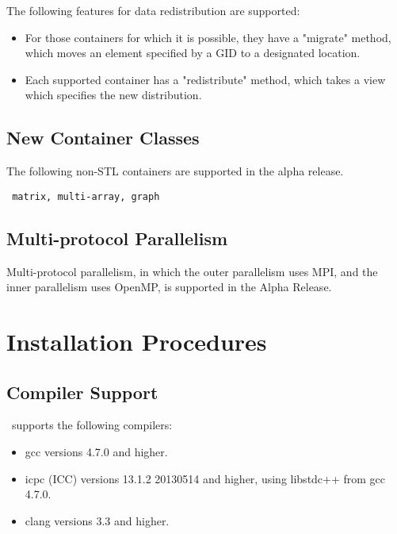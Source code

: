 \documentclass{report}
\begin{document}
The following features for data redistribution are supported:

\begin{itemize}
\item
For those containers for which it is possible, they have a "migrate" 
method, which moves an element specified by a GID to a designated
location.
\item
Each supported container has a "redistribute" method, 
which takes a view which specifies the new distribution.
\end{itemize}


\section{New Container Classes}

\noindent
The following non-STL containers are supported in the alpha release.

{\tt
matrix, multi-array, graph
}


\section{Multi-protocol Parallelism}

\noindent
Multi-protocol parallelism, in which the outer parallelism uses MPI,
and the inner parallelism uses OpenMP, is supported in the Alpha Release.


\chapter{Installation Procedures}

\section{Compiler Support}

\stapl\ supports the following compilers:

\begin{itemize}
\item
gcc versions 4.7.0 and higher.
\item
icpc (ICC) versions 13.1.2 20130514 and higher, using libstdc++ from
gcc 4.7.0.
\item
clang versions 3.3 and higher.
\end{itemize}
\end{document}
